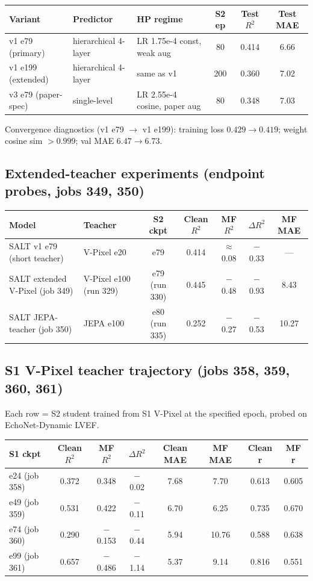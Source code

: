 \documentclass{article}
\begin{document}
\begin{center}
\begin{tabular}{lllccc}
\toprule
Variant & Predictor & HP regime & S2 ep & Test $R^2$ & Test MAE \\
\midrule
v1 e79 (primary) & hierarchical 4-layer & LR 1.75e-4 const, weak aug & 80 & 0.414 & 6.66 \\
v1 e199 (extended) & hierarchical 4-layer & same as v1 & 200 & 0.360 & 7.02 \\
v3 e79 (paper-spec) & single-level & LR 2.55e-4 cosine, paper aug & 80 & 0.348 & 7.03 \\
\bottomrule
\end{tabular}
\end{center}

Convergence diagnostics (v1 e79 $\to$ v1 e199):
training loss $0.429 \to 0.419$; weight cosine sim $>0.999$; val MAE $6.47 \to 6.73$.

\subsection{Extended-teacher experiments (endpoint probes, jobs 349, 350)}

\begin{center}
\begin{tabular}{llccccc}
\toprule
Model & Teacher & S2 ckpt & Clean $R^2$ & MF $R^2$ & $\Delta R^2$ & MF MAE \\
\midrule
SALT v1 e79 (short teacher) & V-Pixel e20 & e79 & 0.414 & $\approx$0.08 & $-$0.33 & --- \\
SALT extended V-Pixel (job 349) & V-Pixel e100 (run 329) & e79 (run 330) & 0.445 & $-$0.48 & $-$0.93 & 8.43 \\
SALT JEPA-teacher (job 350) & JEPA e100 & e80 (run 335) & 0.252 & $-$0.27 & $-$0.53 & 10.27 \\
\bottomrule
\end{tabular}
\end{center}

\subsection{S1 V-Pixel teacher trajectory (jobs 358, 359, 360, 361)}

Each row = S2 student trained from S1 V-Pixel at the specified epoch, probed on EchoNet-Dynamic LVEF.

\begin{center}
\begin{tabular}{lccccccc}
\toprule
S1 ckpt & Clean $R^2$ & MF $R^2$ & $\Delta R^2$ & Clean MAE & MF MAE & Clean r & MF r \\
\midrule
e24 (job 358) & 0.372 & 0.348 & $-$0.02 & 7.68 & 7.70 & 0.613 & 0.605 \\
e49 (job 359) & 0.531 & 0.422 & $-$0.11 & 6.70 & 6.25 & 0.735 & 0.670 \\
e74 (job 360) & 0.290 & $-$0.153 & $-$0.44 & 5.94 & 10.76 & 0.588 & 0.638 \\
e99 (job 361) & 0.657 & $-$0.486 & $-$1.14 & 5.37 & 9.14 & 0.816 & 0.551 \\
\bottomrule
\end{tabular}
\end{center}
\end{document}
